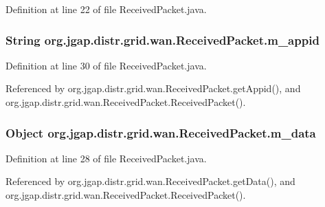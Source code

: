 Definition at line 22 of file Received\-Packet.\-java.

\hypertarget{classorg_1_1jgap_1_1distr_1_1grid_1_1wan_1_1_received_packet_aa923449981d9796ac53ff80caee8782a}{
\subsubsection[{m\-\_\-appid}]{\setlength{\rightskip}{0pt plus 5cm}String org.\-jgap.\-distr.\-grid.\-wan.\-Received\-Packet.\-m\-\_\-appid\hspace{0.3cm}{\ttfamily [private]}}}\label{classorg_1_1jgap_1_1distr_1_1grid_1_1wan_1_1_received_packet_aa923449981d9796ac53ff80caee8782a}


Definition at line 30 of file Received\-Packet.\-java.



Referenced by org.\-jgap.\-distr.\-grid.\-wan.\-Received\-Packet.\-get\-Appid(), and org.\-jgap.\-distr.\-grid.\-wan.\-Received\-Packet.\-Received\-Packet().

\hypertarget{classorg_1_1jgap_1_1distr_1_1grid_1_1wan_1_1_received_packet_a125c360bf245e271f8748c8043060ca3}{
\subsubsection[{m\-\_\-data}]{\setlength{\rightskip}{0pt plus 5cm}Object org.\-jgap.\-distr.\-grid.\-wan.\-Received\-Packet.\-m\-\_\-data\hspace{0.3cm}{\ttfamily [private]}}}\label{classorg_1_1jgap_1_1distr_1_1grid_1_1wan_1_1_received_packet_a125c360bf245e271f8748c8043060ca3}


Definition at line 28 of file Received\-Packet.\-java.



Referenced by org.\-jgap.\-distr.\-grid.\-wan.\-Received\-Packet.\-get\-Data(), and org.\-jgap.\-distr.\-grid.\-wan.\-Received\-Packet.\-Received\-Packet().

